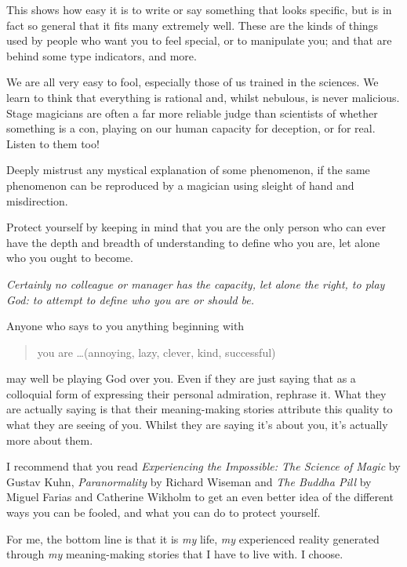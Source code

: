 This shows how easy it is to write or say something that looks specific, but is in fact so general that it fits many extremely well. These are the kinds of things used by people who want you to feel special, or to manipulate you; and that are behind some type indicators, and more.


We are all very easy to fool, especially those of us trained in the sciences. We learn to think that everything is rational and, whilst nebulous, is never malicious. Stage magicians are often a far more reliable judge than scientists of whether something is a con, playing on our human capacity for deception, or for real. Listen to them too! 


Deeply mistrust any mystical explanation of some phenomenon, if the same phenomenon can be reproduced by a magician using sleight of hand and misdirection.


Protect yourself by keeping in mind that you are the only person who can ever have the depth and breadth of understanding to define who you are, let alone who you ought to become. 


\emph{Certainly no colleague or manager has the capacity, let alone the right, to play God: to attempt to define who you are or should be.} 


Anyone who says to you anything beginning with \begin{quote} you are \ldots (annoying, lazy, clever, kind, successful) \end{quote} may well be playing God over you. Even if they are just saying that as a colloquial form of expressing their personal admiration, rephrase it. What they are actually saying is that their meaning\hyp{}making stories attribute this quality to what they are seeing of you. Whilst they are saying it’s about you, it's actually more about them.


I recommend that you read \emph{Experiencing the Impossible: The Science of Magic} by Gustav Kuhn\cite{kuhn-magic}, \emph{Paranormality} by Richard Wiseman\cite{wiseman-paranormality} and \emph{The Buddha Pill} by Miguel Farias and Catherine Wikholm\cite{farias-buddha} to get an even better idea of the different ways you can be fooled, and what you can do to protect yourself.


For me, the bottom line is that it is \emph{my} life, \emph{my} experienced reality generated through \emph{my} meaning\hyp{}making stories that I have to live with. I choose.








